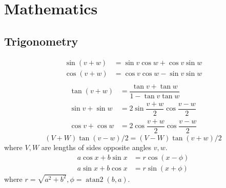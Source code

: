 
\chapter{Mathematics}






\section{Trigonometry}
\begin{align*}
\sin(v+w)&{}=\sin v\cos w+\cos v\sin w\\
\cos(v+w)&{}=\cos v\cos w-\sin v\sin w\\
\end{align*}
\begin{align*}
\tan(v+w)&{}=\dfrac{\tan v+\tan w}{1-\tan v\tan w}\\
\sin v+\sin w&{}=2\sin\dfrac{v+w}{2}\cos\dfrac{v-w}{2}\\
\cos v+\cos w&{}=2\cos\dfrac{v+w}{2}\cos\dfrac{v-w}{2}
\end{align*}
\[ (V+W)\tan(v-w)/2{}=(V-W)\tan(v+w)/2 \]
where $V, W$ are lengths of sides opposite angles $v, w$.
\begin{align*}
	a\cos x+b\sin x&=r\cos(x-\phi)\\
	a\sin x+b\cos x&=r\sin(x+\phi)
\end{align*}
where $r=\sqrt{a^2+b^2}, \phi=\operatorname{atan2}(b,a)$.

